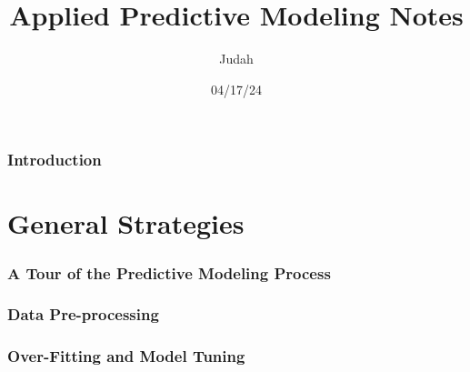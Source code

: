 \documentclass[12pt, a4paper]{article}
\title{Applied Predictive Modeling Notes}
\author{Judah}
\date{04/17/24}
\theoremstyle{mystyle}
\begin{document}
\maketitle
\tableofcontents
    
\section{Introduction}
    

\part{General Strategies}
    \section{A Tour of the Predictive Modeling Process}
    
    
    \section{Data Pre-processing}
    

    \section{Over-Fitting and Model Tuning}
    

%     
%     
%     
%     
%     
%     

%     
%     
%     
%     
%     
%     
%     

%     
%     
%     
\end{document}
